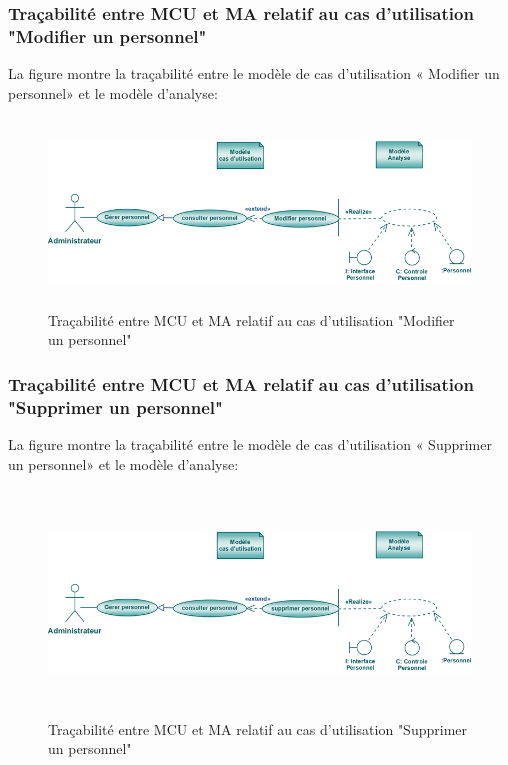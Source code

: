 \documentclass[12 pt]{report}
\begin{document}
\subsubsection{Traçabilité entre MCU et MA relatif au cas d’utilisation "Modifier un personnel" }
La figure  montre la traçabilité entre le modèle de cas d’utilisation « Modifier un personnel» et le modèle
d’analyse:
\begin{figure}[h]
\begin{center}
\includegraphics[width= 14cm , height =5cm]{tma.png}
\caption{Traçabilité entre MCU et MA relatif au cas d’utilisation "Modifier un personnel"}
\end{center}
\end{figure}

\subsubsection{Traçabilité entre MCU et MA relatif au cas d’utilisation "Supprimer un personnel" }
La figure  montre la traçabilité entre le modèle de cas d’utilisation « Supprimer un personnel» et le modèle
d’analyse:
\begin{figure}[h]
\begin{center}
\includegraphics[width= 14cm , height =6cm]{tracsupp.png}
\caption{Traçabilité entre MCU et MA relatif au cas d’utilisation "Supprimer un personnel" }
\end{center}
\end{figure} 
\end{document}
